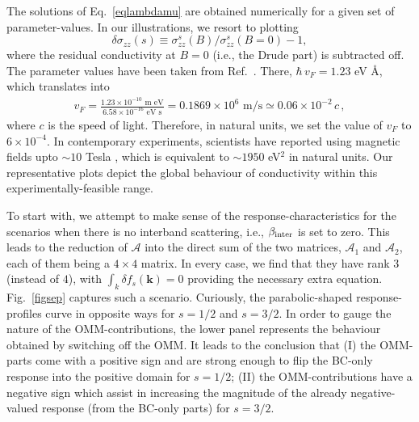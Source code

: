 \documentclass[aps,prb,onecolumn,nofootinbib,citeautoscript,10pt, showkeys]{revtex4-2}
\begin{document}
The solutions of Eq.~\eqref{eqlambdamu} are obtained numerically for a given set of parameter-values. In our illustrations, we resort to plotting
$$\delta \sigma_{zz} (s) \equiv \sigma^s_{zz} (B) / \sigma^s_{zz}(B=0)  -1 ,$$
where the residual conductivity at $B=0$ (i.e.,  the Drude part) is subtracted off. The parameter values have been taken from Ref.~\cite{xu2020_optical}. There, $\hbar\, v_F = 1.23 $ eV {\AA}, which translates into
\begin{align*}
v_F  = \frac{1.23 \times 10^{-10} \text{ m eV}} {6.58 \times 10^{-16} \text{ eV s}}
= 0.1869  \times 10^{6}\text{ m/s} \simeq 0.06 \times 10^{-2} \,c\,,
\end{align*}
where $c$ is the speed of light. Therefore, in natural units, we set the value of $v_F$ to $6\times 10^{-4}$. In contemporary experiments, scientists have reported using magnetic fields upto $\sim 10 $ Tesla \cite{claudia-multifold}, which is equivalent to $\sim 1950$ eV$^2$ in natural units. Our representative plots depict the global behaviour of conductivity within this experimentally-feasible range.



To start with, we attempt to make sense of the response-characteristics for the scenarios when there is no interband scattering, i.e., $\beta_{\rm inter } $ is set to zero. This leads to the reduction of $  \mathcal A $ into the direct sum of the two matrices, $ \mathcal{A}_1 $ and $ \mathcal{A}_2 $, each of them being a $4\times 4$ matrix. In every case, we find that they have rank $3$ (instead of $4$), with $ \int_k  \delta f_s (\boldsymbol {k}) = 0$ providing the necessary extra equation. Fig.~\ref{figsep} captures such a scenario. Curiously, the parabolic-shaped response-profiles curve in opposite ways for $s=1/2$ and $s= 3/2$. In order to gauge the nature of the OMM-contributions, the lower panel represents the behaviour obtained by switching off the OMM. It leads to the conclusion that (I) the OMM-parts come with a positive sign and are strong enough to flip the BC-only response into the positive domain for $s=1/2$; (II) the OMM-contributions have a negative sign which assist in increasing the magnitude of the already negative-valued response (from the BC-only parts) for $s=3/2$.
\end{document}
